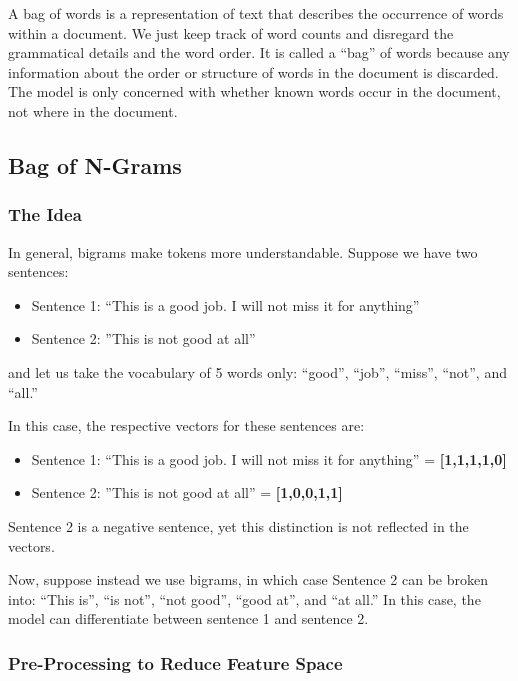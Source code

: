 \documentclass[
]{book}
\providecommand{\tightlist}{%
  \setlength{\itemsep}{0pt}\setlength{\parskip}{0pt}}
\begin{document}
A bag of words is a representation of text that describes the occurrence of words within a document. We just keep track of word counts and disregard the grammatical details and the word order. It is called a ``bag'' of words because any information about the order or structure of words in the document is discarded. The model is only concerned with whether known words occur in the document, not where in the document.

\hypertarget{bag-of-n-grams}{%
\subsection{Bag of N-Grams}\label{bag-of-n-grams}}

\hypertarget{the-idea}{%
\subsubsection{The Idea}\label{the-idea}}

In general, bigrams make tokens more understandable. Suppose we have two sentences:

\begin{itemize}
\tightlist
\item
  Sentence 1: ``This is a good job. I will not miss it for anything''
\item
  Sentence 2: ''This is not good at all''
\end{itemize}

and let us take the vocabulary of 5 words only: ``good'', ``job'', ``miss'', ``not'', and ``all.''

In this case, the respective vectors for these sentences are:

\begin{itemize}
\tightlist
\item
  Sentence 1: ``This is a good job. I will not miss it for anything'' = \textbf{{[}1,1,1,1,0{]}}
\item
  Sentence 2: ''This is not good at all'' = \textbf{{[}1,0,0,1,1{]}}
\end{itemize}

Sentence 2 is a negative sentence, yet this distinction is not reflected in the vectors.

Now, suppose instead we use bigrams, in which case Sentence 2 can be broken into: ``This is'', ``is not'', ``not good'', ``good at'', and ``at all.'' In this case, the model can differentiate between sentence 1 and sentence 2.

\hypertarget{pre-processing-to-reduce-feature-space}{%
\subsubsection{Pre-Processing to Reduce Feature Space}\label{pre-processing-to-reduce-feature-space}}
\end{document}
